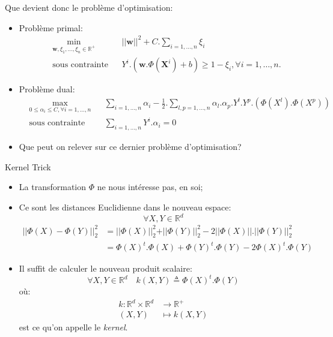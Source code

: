\documentclass[8pt]{beamer}
\begin{document}
	\begin{frame}{Que devient donc le problème d'optimisation:}
		\begin{itemize}
			\item  Problème primal:
			\begin{equation}
				\begin{aligned}
				& \min_{\textbf{w}, \xi_1,\dots,\xi_n \in \mathbb{R}^+}
				& & {\vert\vert \textbf{w} \vert\vert}^2 + C.\sum_{i=1,\dots,n}\xi_i \\
				& \text{sous contrainte}
				& & Y^i.(\textbf{w}.\Phi(\textbf{X}^i) + b) \geq 1 - \xi_i , \forall i = 1, \dots, n.
				\end{aligned}
			\end{equation}
			\item  Problème dual:
			\begin{equation}
				\begin{aligned}
				& \max_{0 \leq \alpha_i \leq C ,\forall i=1,\dots,n}
				& & \sum_{i=1,\dots,n} \alpha_i - \frac{1}{2}.\sum_{l,p=1,\dots,n}\alpha_l.\alpha_p.Y^l.Y^p.(\Phi(X^l).\Phi(X^p))\\
				& \text{sous contrainte}
				& & \sum_{i=1,\dots,n}Y^i.\alpha_i=0
				\end{aligned}
			\end{equation}
			\item  Que peut on relever sur ce dernier problème d'optimisation?
		\end{itemize}
	\end{frame}

	\begin{frame}{Kernel Trick}
		\begin{itemize}
			\item <1-> La transformation $\Phi$ ne nous intéresse pas, en soi;
			\item <2-> Ce sont les distances Euclidienne dans le nouveau espace:
			$$\forall X, Y \in \mathbb{R}^d$$
			\begin{align*}
				\vert\vert\Phi(X) - \Phi(Y)\vert\vert_2^2 &= \vert\vert\Phi(X)\vert\vert_2^2 + \vert\vert\Phi(Y)\vert\vert_2^2 - 2 \vert\vert\Phi(X)\vert\vert.\vert\vert\Phi(Y)\vert\vert_2^2 \\
				 &= {\Phi(X)}^t.\Phi(X) + {\Phi(Y)}^t.\Phi(Y) - 2 {\Phi(X)}^t.\Phi(Y)
			\end{align*}
			\item <3-> Il suffit de calculer le nouveau produit scalaire:
			\begin{equation}
				\forall X, Y \in \mathbb{R}^d \quad k(X, Y) \triangleq {\Phi(X)}^t.\Phi(Y)
			\end{equation}
			où:
			\begin{align*}
				k: \mathbb{R}^d \times \mathbb{R}^d &\rightarrow \mathbb{R}^+ \\
				(X, Y) &\mapsto k(X, Y)
			\end{align*}
			est ce qu'on appelle le \textit{kernel}.
		\end{itemize}
	\end{frame}
\end{document}

